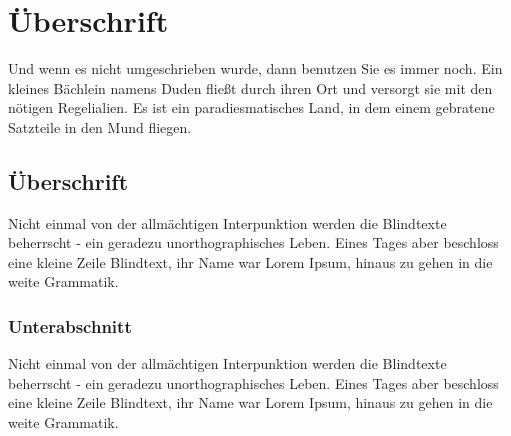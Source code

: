 \documentclass[%
	12pt,%
	a4paper,%
	oneside,%
	listof=totoc,
 	index=totoc,
	bibliography = totoc,
	parskip = half,%
	chapterprefix=false,%
	appendixprefix, %
headings=small,%
]{scrreprt}
\begin{document}
%
%

\section{Überschrift}
Und wenn es nicht umgeschrieben wurde, dann benutzen Sie es immer noch. Ein kleines Bächlein namens Duden fließt durch ihren Ort und versorgt sie mit den nötigen Regelialien. Es ist ein paradiesmatisches Land, in dem einem gebratene Satzteile in den Mund fliegen. 

\subsection{Überschrift}
Nicht einmal von der allmächtigen Interpunktion werden die Blindtexte beherrscht - ein geradezu unorthographisches Leben. Eines Tages aber beschloss eine kleine Zeile Blindtext, ihr Name war Lorem Ipsum, hinaus zu gehen in die weite Grammatik.

\subsubsection{Unterabschnitt}
Nicht einmal von der allmächtigen Interpunktion werden die Blindtexte beherrscht - ein geradezu unorthographisches Leben. Eines Tages aber beschloss eine kleine Zeile Blindtext, ihr Name war Lorem Ipsum, hinaus zu gehen in die weite Grammatik.
\end{document}
